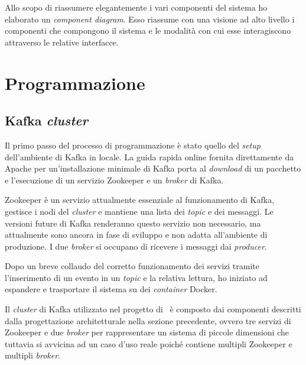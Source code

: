 Allo scopo di riassumere elegantemente i vari componenti del sistema ho elaborato un  \textit{component diagram}.
Esso riassume con una visione ad alto livello i componenti che compongono il sistema e le modalità con cui esse interagiscono attraverso le relative interfacce.






\section{Programmazione}

\subsection{Kafka \textit{cluster}}

Il primo passo del processo di programmazione è stato quello del \textit{setup} dell'ambiente di Kafka in locale.
La guida rapida online fornita direttamente da Apache per un'installazione minimale di Kafka porta al \textit{download} di un pacchetto e l'esecuzione di un servizio Zookeeper e un \textit{broker} di Kafka.

Zookeeper è un servizio attualmente essenziale al funzionamento di Kafka, gestisce i nodi del \textit{cluster} e mantiene una lista dei \textit{topic} e dei messaggi.
Le versioni future di Kafka renderanno questo servizio non necessario, ma attualmente sono ancora in fase di sviluppo e non adatta all'ambiente di produzione.
I due \textit{broker} si occupano di ricevere i messaggi dai \textit{producer}.

Dopo un breve collaudo del corretto funzionamento dei servizi tramite l'inserimento di un evento in un \textit{topic} e la relativa lettura, ho iniziato ad espandere e trasportare il sistema su dei \textit{container} Docker.

Il \textit{cluster} di Kafka utilizzato nel progetto di \stage\ è composto dai componenti descritti dalla progettazione architetturale nella sezione precedente, ovvero tre servizi di Zookeeper e due \textit{broker} per rappresentare un sistema di piccole dimensioni che tuttavia si avvicina ad un caso d'uso reale poiché contiene multipli Zookeeper e multipli \textit{broker}.

